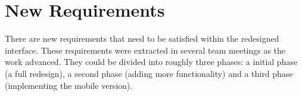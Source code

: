 \section{New Requirements} %
\label{sec:new_requirements}

There are new requirements that need to be satisfied within the redesigned  interface.
These requirements were extracted in several team meetings as the work advanced.
They could be divided into roughly three phases: a initial phase (a full redesign), a second phase (adding more functionality) and a third phase (implementing the mobile version).





